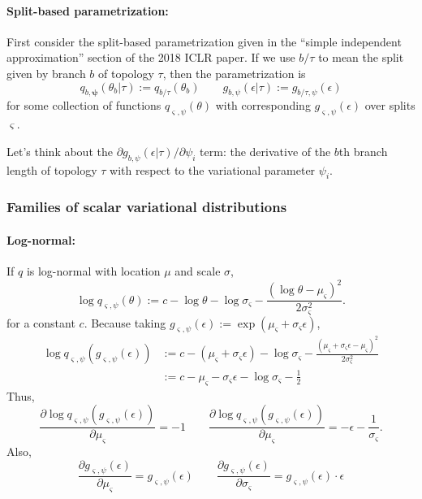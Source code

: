\documentclass{article}
\begin{document}
\paragraph{Split-based parametrization:}
First consider the split-based parametrization given in the ``simple independent approximation'' section of the 2018 ICLR paper.
If we use $b / \tau$ to mean the split given by branch $b$ of topology $\tau$, then the parametrization is
\[
q_{b, \bm{\psi}}(\theta_b | \tau) := q_{b / \tau}(\theta_b)
\qquad
g_{b,\psi}(\epsilon | \tau) := g_{b / \tau,\psi}(\epsilon)
\]
for some collection of functions $q_{\varsigma, \psi}(\theta)$ with corresponding $g_{\varsigma,\psi}(\epsilon)$ over splits $\varsigma$.

Let's think about the $\partial g_{b,\psi}(\epsilon | \tau) / \partial \psi_i$ term: the derivative of the $b$th branch length of topology $\tau$ with respect to the variational parameter $\psi_i$.


\subsubsection*{Families of scalar variational distributions}
\paragraph{Log-normal:}
If $q$ is log-normal with location $\mu$ and scale $\sigma$,
\[
\log q_{\varsigma, \psi}(\theta) := c - \log \theta - \log \sigma_\varsigma - \frac{(\log \theta - \mu_\varsigma)^2}{2 \sigma_\varsigma^2}.
\]
for a constant $c$.
Because taking $g_{\varsigma,\psi}(\epsilon) := \exp(\mu_\varsigma + \sigma_\varsigma \epsilon)$,
\begin{align*}
\log q_{\varsigma, \psi}(g_{\varsigma,\psi}(\epsilon))
& := c - (\mu_\varsigma + \sigma_\varsigma \epsilon)
    - \log \sigma_\varsigma
    - \frac{(\mu_\varsigma + \sigma_\varsigma \epsilon - \mu_\varsigma)^2}{2 \sigma_\varsigma^2} \\
 & := c - \mu_\varsigma - \sigma_\varsigma \epsilon - \log \sigma_\varsigma - \frac{1}{2}
\end{align*}
Thus,
\begin{equation}
    \frac{\partial \log q_{\varsigma, \psi}(g_{\varsigma,\psi}(\epsilon))}{\partial \mu_\varsigma} = -1
    \qquad
    \frac{\partial \log q_{\varsigma, \psi}(g_{\varsigma,\psi}(\epsilon))}{\partial \mu_\varsigma} = -\epsilon - \frac{1}{\sigma_\varsigma}.
\end{equation}
Also,
\begin{equation}
    \frac{\partial g_{\varsigma,\psi}(\epsilon)}{\partial \mu_\varsigma} = g_{\varsigma,\psi}(\epsilon)
    \qquad
    \frac{\partial g_{\varsigma,\psi}(\epsilon)}{\partial \sigma_\varsigma} = g_{\varsigma,\psi}(\epsilon) \cdot \epsilon
\end{equation}


\nocite{vbpi}



\end{document}
